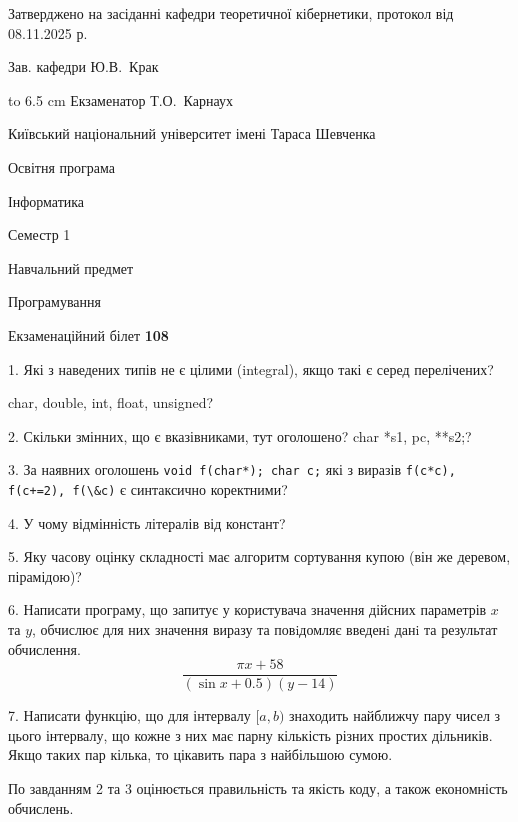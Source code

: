\documentclass[12pt, ukrainian]{article}
\def\code#1{\Verb!#1!}
\begin{document}
{\smallskip\smallskip \begin {scriptsize} Затверджено на засіданні кафедри теоретичної кібернетики, протокол   від   08.11.2025 р.\par\smallskip\smallskip\smallskip\smallskip
{\parbox {6.5 cm} {Зав. кафедри \dotfill Ю.В.~Крак}}\hspace {0.7cm} {\hbox to 6.5 cm { Екзаменатор \dotfill Т.О.~Карнаух}} \end{scriptsize}}
\vspace{0.9cm}
{{\begin {scriptsize}\par
{ \center  Київський національний університет імені Тараса Шевченка \par}
{\parbox {5 cm}{Освітня програма \hfill}{\parbox {7 cm}{Інформатика\hfill}}\parbox {6 cm}{\hfill Семестр 1}}\par
{\parbox {5 cm} {Навчальний предмет \hfill}\parbox {7 cm}{Програмування \hfill}\parbox {6cm}{\hfill}\par}\vspace{-15pt} \end{scriptsize}}{\center Екзаменаційний білет \No \textbf { 108 }\par}}
{%
1. Які з наведених типів не є цілими (integral), якщо такі є серед перелічених?

char, double, int, float, unsigned?
\par
\vspace{2mm}
2. Скільки змінних, що є вказівниками, тут оголошено?
char *s1, pc, **s2;?
\par
\vspace{2mm}
3. За наявних оголошень \code{void f(char*); char c;} які з виразів \code{f(c*c), f(c+=2), f(\&c)} є синтаксично коректними?
\par
\vspace{2mm}
4. У чому відмінність літералів від констант?
\par
\vspace{2mm}
5. Яку часову оцінку складності має алгоритм сортування купою (він же деревом, пірамідою)?
\par
\vspace{2mm}
6. Написати програму, що запитує у користувача значення дійсних параметрів $x$ та $y$, обчислює для них значення виразу та повiдомляє введенi данi та результат обчислення.
$$\frac{\pi x + 58}{(\sin x + 0.5) (y - 14)}$$ 

\par
7. Написати функцію, що для інтервалу $[a, b)$ знаходить найближчу пару чисел з цього інтервалу, що кожне з них має парну кількість різних простих дільників. Якщо таких пар кілька, то цікавить пара з найбільшою сумою.

По завданням 2 та 3 оцінюється правильність та якість коду, а також економність обчислень.

}
\end{document}
